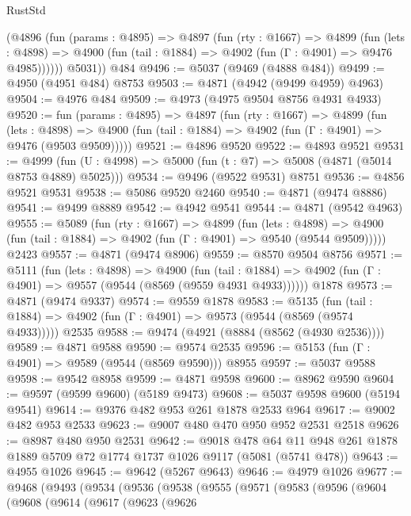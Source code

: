 \begin{lexlean}{RustStd}
\begin{coremodule}
        (@4896
          (fun (params : @4895) =>
          @4897
            (fun (rty : @1667) =>
            @4899
              (fun (lets : @4898) =>
              @4900 (fun (tail : @1884) => @4902 (fun (Γ : @4901) => @9476 @4985))))))
        @5031))
    @484
@9496 := @5037 (@9469 (@4888 @484))
@9499 := @4950 (@4951 @484) @8753
@9503 := @4871 (@4942 (@9499 @4959) @4963)
@9504 := @4976 @484
@9509 := @4973 (@4975 @9504 @8756 @4931 @4933)
@9520 := fun (params : @4895) =>
  @4897
    (fun (rty : @1667) =>
    @4899
      (fun (lets : @4898) =>
      @4900 (fun (tail : @1884) => @4902 (fun (Γ : @4901) => @9476 (@9503 @9509)))))
@9521 := @4896 @9520
@9522 := @4893 @9521
@9531 := @4999 (fun (U : @4998) => @5000 (fun (t : @7) => @5008 (@4871 (@5014 @8753 @4889) @5025)))
@9534 := @9496 (@9522 @9531) @8751
@9536 := @4856 @9521 @9531
@9538 := @5086 @9520 @2460
@9540 := @4871 (@9474 @8886)
@9541 := @9499 @8889
@9542 := @4942 @9541
@9544 := @4871 (@9542 @4963)
@9555 := @5089
    (fun (rty : @1667) =>
    @4899
      (fun (lets : @4898) =>
      @4900 (fun (tail : @1884) => @4902 (fun (Γ : @4901) => @9540 (@9544 @9509)))))
    @2423
@9557 := @4871 (@9474 @8906)
@9559 := @8570 @9504 @8756
@9571 := @5111
    (fun (lets : @4898) =>
    @4900
      (fun (tail : @1884) => @4902 (fun (Γ : @4901) => @9557 (@9544 (@8569 (@9559 @4931 @4933))))))
    @1878
@9573 := @4871 (@9474 @9337)
@9574 := @9559 @1878
@9583 := @5135
    (fun (tail : @1884) => @4902 (fun (Γ : @4901) => @9573 (@9544 (@8569 (@9574 @4933)))))
    @2535
@9588 := @9474 (@4921 (@8884 (@8562 (@4930 @2536))))
@9589 := @4871 @9588
@9590 := @9574 @2535
@9596 := @5153 (fun (Γ : @4901) => @9589 (@9544 (@8569 @9590))) @8955
@9597 := @5037 @9588
@9598 := @9542 @8958
@9599 := @4871 @9598
@9600 := @8962 @9590
@9604 := @9597 (@9599 @9600) (@5189 @9473)
@9608 := @5037 @9598 @9600 (@5194 @9541)
@9614 := @9376 @482 @953 @261 @1878 @2533 @964
@9617 := @9002 @482 @953 @2533
@9623 := @9007 @480 @470 @950 @952 @2531 @2518
@9626 := @8987 @480 @950 @2531
@9642 := @9018
    @478
    @64
    @11
    @948
    @261
    @1878
    @1889
    @5709
    @72
    @1774
    @1737
    @1026
    @9117
    (@5081 (@5741 @478))
@9643 := @4955 @1026
@9645 := @9642 (@5267 @9643)
@9646 := @4979 @1026
@9677 := @9468
    (@9493
      (@9534
        (@9536
          (@9538
            (@9555
              (@9571
                (@9583
                  (@9596
                    (@9604
                      (@9608
                        (@9614
                          (@9617
                            (@9623
                              (@9626

\end{coremodule}
\end{lexlean}

